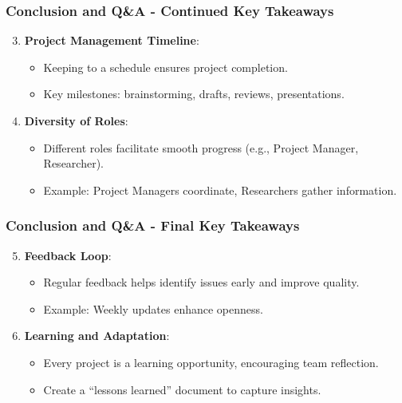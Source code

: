 \documentclass[aspectratio=169]{beamer}
\begin{document}
\begin{frame}[fragile]
    \frametitle{Conclusion and Q\&A - Continued Key Takeaways}
    \begin{enumerate}
        \setcounter{enumi}{2}
        \item \textbf{Project Management Timeline}:
        \begin{itemize}
            \item Keeping to a schedule ensures project completion.
            \item Key milestones: brainstorming, drafts, reviews, presentations.
        \end{itemize}

        \item \textbf{Diversity of Roles}:
        \begin{itemize}
            \item Different roles facilitate smooth progress (e.g., Project Manager, Researcher).
            \item Example: Project Managers coordinate, Researchers gather information.
        \end{itemize}
    \end{enumerate}
\end{frame}

\begin{frame}[fragile]
    \frametitle{Conclusion and Q\&A - Final Key Takeaways}
    \begin{enumerate}
        \setcounter{enumi}{4}
        \item \textbf{Feedback Loop}:
        \begin{itemize}
            \item Regular feedback helps identify issues early and improve quality.
            \item Example: Weekly updates enhance openness.

        \end{itemize}

        \item \textbf{Learning and Adaptation}:
        \begin{itemize}
            \item Every project is a learning opportunity, encouraging team reflection.
            \item Create a “lessons learned” document to capture insights.
        \end{itemize}
    \end{enumerate}
\end{frame}
\end{document}
